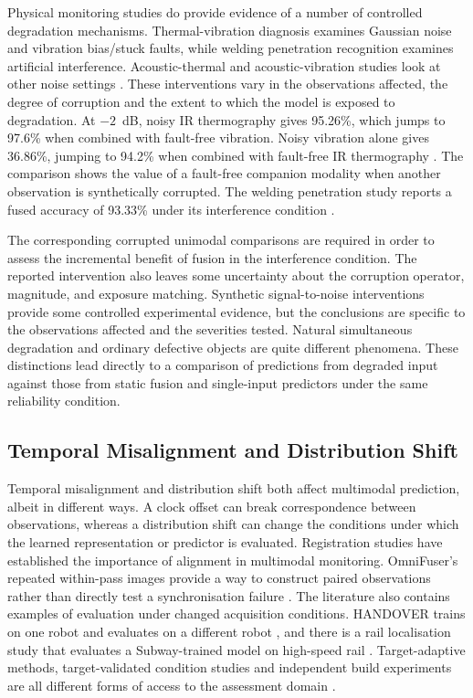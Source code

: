 Physical monitoring studies do provide evidence of a number of controlled degradation mechanisms.
Thermal-vibration diagnosis examines Gaussian noise and vibration bias/stuck faults, while welding
penetration recognition examines artificial interference. Acoustic-thermal and acoustic-vibration
studies look at other noise settings
\parencite{Huo2022Multisensor,Hua2026Weld,Ying2025Trustworthy,Huang2026Rolling}.
These interventions vary in the observations affected, the degree of corruption and the extent to
which the model is exposed to degradation.
At $-2$~dB, noisy IR thermography gives 95.26\%, which jumps to 97.6\% when combined with fault-free
vibration. Noisy vibration alone gives 36.86\%, jumping to 94.2\% when combined with fault-free IR
thermography \parencite[Table~VIII]{Huo2022Multisensor}.
The comparison shows the value of a fault-free companion modality when another observation is
synthetically corrupted.
The welding penetration study reports a fused accuracy of 93.33\% under its interference condition
\parencite[Table~3]{Hua2026Weld}.

The corresponding corrupted unimodal comparisons are required in order to assess the incremental
benefit of fusion in the interference condition. The reported intervention also leaves some
uncertainty about the corruption operator, magnitude, and exposure matching.
Synthetic signal-to-noise interventions provide some controlled experimental evidence, but the
conclusions are specific to the observations affected and the severities tested. Natural
simultaneous degradation and ordinary defective objects are quite different phenomena.
These distinctions lead directly to a comparison of predictions from degraded input against those
from static fusion and single-input predictors under the same reliability condition.

\subsection{Temporal Misalignment and Distribution Shift}

Temporal misalignment and distribution shift both affect multimodal prediction, albeit in different
ways.
A clock offset can break correspondence between observations, whereas a distribution shift can
change the conditions under which the learned representation or predictor is evaluated.
Registration studies have established the importance of alignment in multimodal monitoring.
OmniFuser's repeated within-pass images provide a way to construct paired observations rather than
directly test a synchronisation failure \parencite{Petrich2021Multimodal,Chen2023Multisensor,P021}.
The literature also contains examples of evaluation under changed acquisition conditions. HANDOVER
trains on one robot and evaluates on a different robot \parencite[Table~V]{Thoduka2024Handover}, and there is a rail localisation study that
evaluates a Subway-trained model on high-speed rail
\parencite[Table~III]{P031}.
Target-adaptive methods, target-validated condition studies and independent build experiments are
all different forms of access to the assessment domain
\parencite{Wang2025A,Chu2024A,Huang2026Rolling,Bevans2023Heterogeneous}.

